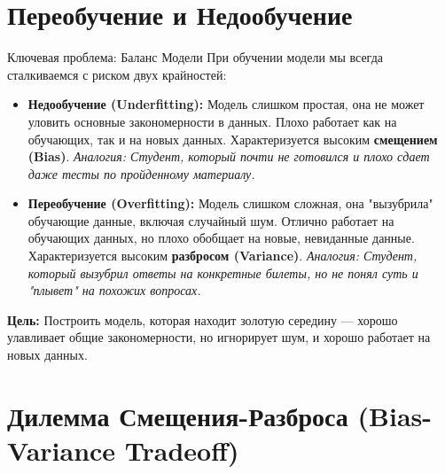     \section{Переобучение и Недообучение}
    
    \begin{alerttextbox}{Ключевая проблема: Баланс Модели}
    При обучении модели мы всегда сталкиваемся с риском двух крайностей:
    
    \begin{itemize}
        \item \textbf{Недообучение (Underfitting):} Модель слишком простая, она не может уловить основные закономерности в данных. Плохо работает как на обучающих, так и на новых данных. Характеризуется высоким \textbf{смещением (Bias)}. \textit{Аналогия: Студент, который почти не готовился и плохо сдает даже тесты по пройденному материалу.}
        \item \textbf{Переобучение (Overfitting):} Модель слишком сложная, она "вызубрила" обучающие данные, включая случайный шум. Отлично работает на обучающих данных, но плохо обобщает на новые, невиданные данные. Характеризуется высоким \textbf{разбросом (Variance)}. \textit{Аналогия: Студент, который вызубрил ответы на конкретные билеты, но не понял суть и "плывет" на похожих вопросах.}
    \end{itemize}
    \textbf{Цель:} Построить модель, которая находит золотую середину — хорошо улавливает общие закономерности, но игнорирует шум, и хорошо работает на новых данных.
    \end{alerttextbox}
    
    \section{Дилемма Смещения-Разброса (Bias-Variance Tradeoff)}
    
